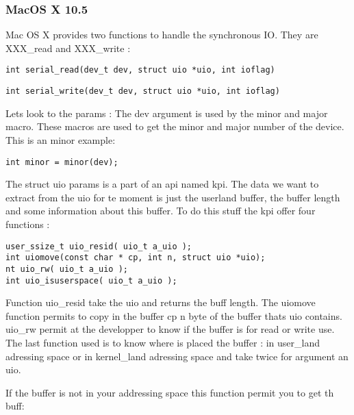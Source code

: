 \documentclass[11pt]{report}
\begin{document}
\subsubsection{MacOS X 10.5}

Mac OS X provides two functions to handle the synchronous IO. They are
XXX\_read and XXX\_write :

\begin{lstlisting}
int	serial_read(dev_t dev, struct uio *uio, int ioflag)
\end{lstlisting}

\begin{lstlisting}
int	serial_write(dev_t dev, struct uio *uio, int ioflag)
\end{lstlisting}

Lets look to the params : 
The dev argument is used by the minor and major macro. These macros are used
to get the minor and major number of the device. This is an minor example:
\begin{lstlisting}
int minor = minor(dev);
\end{lstlisting}
The struct uio params is a part of an api  named kpi. The data we want to 
extract from the uio for te moment is just the userland buffer, the buffer 
length and some information about this buffer. To do this stuff the kpi offer 
four functions :

\begin{lstlisting}
user_ssize_t uio_resid( uio_t a_uio );
int uiomove(const char * cp, int n, struct uio *uio);
nt uio_rw( uio_t a_uio );
int uio_isuserspace( uio_t a_uio );
\end{lstlisting}

Function uio\_resid take the uio and returns the buff length. The uiomove
function permits to copy in the buffer cp n byte of the buffer thats uio
contains. uio\_rw permit at the developper to know if the buffer is for
read or write use. The last function used is to know where is placed the
buffer : in user\_land adressing space or in kernel\_land adressing space
and take twice for argument an uio.

If the buffer is not in your addressing space this function permit you
to get th buff:
\end{document}
